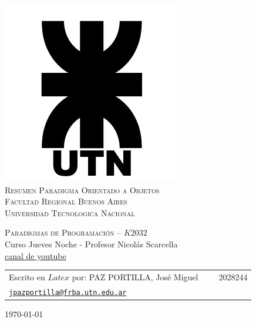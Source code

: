 \begin{titlepage}

\thispagestyle{empty}

\begin{center}
\includegraphics[scale=0.5]{./figuras/logo_utn}\\
\hfill \newline
\large{\textsc{Resumen Paradigma Orientado a Objetos}}\\
\large{\textsc{Facultad Regional Buenos Aires}}\\
\large{\textsc{Universidad Tecnologica Nacional}}\\
\end{center}

\begin{center}
\LARGE{\textsc{Paradigmas de Programación -- $K2032$}}\\
\hfill \newline
\huge{Curso Jueves Noche - Profesor Nicolás Scarcella \\ \href{https://www.youtube.com/watch?v=z20-xv5eLFA&list=PL7wy4vA6RpN51gkoPaU6xmtg7KkZy2aHG}{canal de youtube}}
\end{center}

\vspace{2cm}



\begin{center}
	\begin{tabular}{lc}
		Escrito en $Latex$ por: PAZ PORTILLA, José Miguel & \ \ \ 2028244 \\
		\texttt{\href{mailto:jpazportilla@frba.utn.edu.ar}{jpazportilla@frba.utn.edu.ar}}\\
	\end{tabular}
\end{center}

\vspace{1cm}
\begin{center}
\large{\today}
\end{center}

\end{titlepage}

%
%
{
  \hypersetup{linkcolor=black}
  \tableofcontents
}
\thispagestyle{empty}
\newpage
%
%
\setcounter{page}{1}
